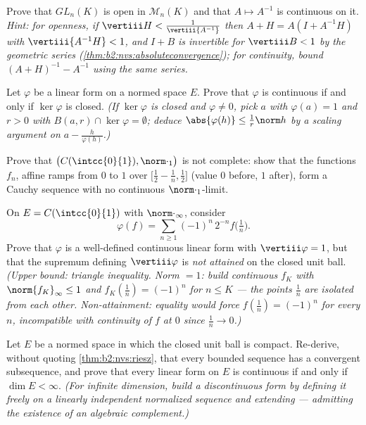 \begin{exercise}[$\star\star$]\label{exo:b2:nvs:5}
Prove that $GL_n(K)$ is open in $\mathcal{M}_n(K)$ and that $A
\mapsto A^{-1}$ is continuous on it. \emph{Hint: for openness, if
$\vertiii H < \frac{1}{\vertiii{A^{-1}}}$ then $A + H = A(I +
A^{-1}H)$ with $\vertiii{A^{-1}H} < 1$, and $I + B$ is invertible
for $\vertiii B < 1$ by the geometric series
(\cref{thm:b2:nvs:absoluteconvergence}); for continuity, bound
$(A+H)^{-1} - A^{-1}$ using the same series.}
\end{exercise}

\begin{exercise}[$\star\star$]\label{exo:b2:nvs:6}
Let $\varphi$ be a linear form on a normed space $E$. Prove that
$\varphi$ is continuous if and only if $\ker\varphi$ is closed.
\emph{(If $\ker\varphi$ is closed and $\varphi \neq 0$, pick $a$
with $\varphi(a) = 1$ and $r > 0$ with $B(a, r) \cap \ker\varphi =
\emptyset$; deduce $\abs{\varphi(h)} \leq \frac{1}{r}\norm h$ by a
scaling argument on $a - \frac{h}{\varphi(h)}$.)}
\end{exercise}

\begin{exercise}[$\star\star$]\label{exo:b2:nvs:7}
Prove that $\bigl(C(\intcc{0}{1}), \norm\cdot_1\bigr)$ is not
complete: show that the functions $f_n$, affine ramps from $0$ to
$1$ over $\bigl[\frac12 - \frac1n, \frac12\bigr]$ (value $0$
before, $1$ after), form a Cauchy sequence with no continuous
$\norm\cdot_1$-limit.
\end{exercise}

\begin{exercise}[$\star\star\star$]\label{exo:b2:nvs:8}
On $E = C(\intcc{0}{1})$ with $\norm\cdot_\infty$, consider
\[
\varphi(f) = \sum_{n \geq 1} (-1)^n\, 2^{-n} f\bigl(\tfrac1n\bigr).
\]
Prove that $\varphi$ is a well-defined continuous linear form with
$\vertiii\varphi = 1$, but that the supremum defining
$\vertiii\varphi$ is \emph{not attained} on the closed unit ball.
\emph{(Upper bound: triangle inequality. Norm $= 1$: build
continuous $f_K$ with $\norm{f_K}_\infty \leq 1$ and $f_K(\frac1n)
= (-1)^n$ for $n \leq K$ --- the points $\frac1n$ are isolated from
each other. Non-attainment: equality would force $f(\frac1n) =
(-1)^n$ for every $n$, incompatible with continuity of $f$ at $0$
since $\frac1n \to 0$.)}
\end{exercise}

\begin{exercise}[$\star\star\star$]\label{exo:b2:nvs:9}
Let $E$ be a normed space in which the closed unit ball is compact.
Re-derive, without quoting \cref{thm:b2:nvs:riesz}, that every
bounded sequence has a convergent subsequence, and prove that every
linear form on $E$ is continuous if and only if $\dim E < \infty$.
\emph{(For infinite dimension, build a discontinuous form by
defining it freely on a linearly independent normalized sequence
and extending --- admitting the existence of an algebraic
complement.)}
\end{exercise}

